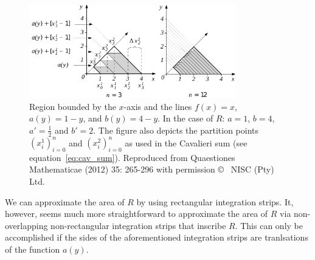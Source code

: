 \documentclass[twoside,reqno,11pt]{fcaa-var} %
\begin{document}
\begin{figure}[htb]
\centering
\includegraphics[width=0.8\textwidth]{fig13.pdf}
\caption{Region bounded by the $x$-axis and the lines $f(x)=x$, $a(y)=1-y$, and $b(y)=4-y$. In the case of $R$: $a=1$, $b=4$, $a'=\frac{1}{2}$ and $b'=2$. The figure also depicts the partition points $(x_i^1)_{i=0}^{n}$ and $(x_i^2)_{i=0}^{n}$ as used in the Cavalieri sum (see equation~\eqref{eq:cav_sum}). Reproduced from Quaestiones Mathematicae (2012) 35: 265-296 with permission \copyright~ NISC (Pty) Ltd.}
\label{fig:caval2}
\end{figure}


\noindent
We can approximate the area of $R$ by using rectangular integration strips. It, however, seems much more straightforward to approximate the area of $R$ via non-overlapping non-rectangular integration strips that inscribe $R$. This can only be accomplished if the sides of the aforementioned integration strips are tranlsations of the function $a(y)$.\\
\end{document}
